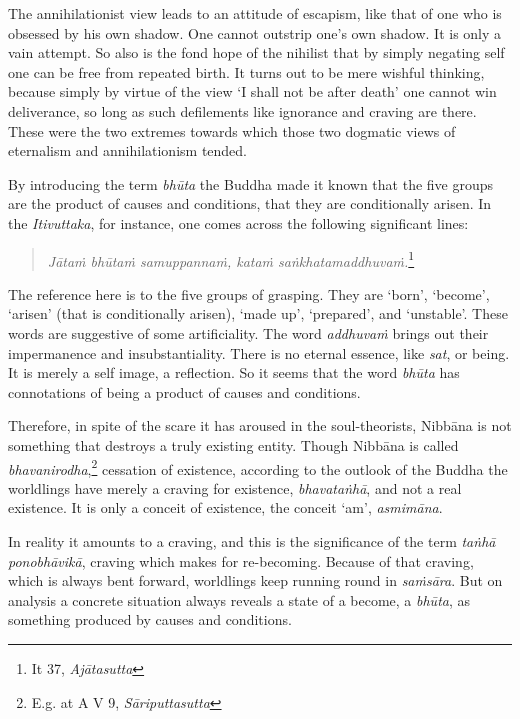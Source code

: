 The annihilationist view leads to an attitude of escapism, like that of one who is obsessed by his own shadow. One cannot outstrip one's own shadow. It is only a vain attempt. So also is the fond hope of the nihilist that by simply negating self one can be free from repeated birth. It turns out to be mere wishful thinking, because simply by virtue of the view `I shall not be after death' one cannot win deliverance, so long as such defilements like ignorance and craving are there. These were the two extremes towards which those two dogmatic views of eternalism and annihilationism tended.

By introducing the term \emph{bhūta} the Buddha made it known that the five groups are the product of causes and conditions, that they are conditionally arisen. In the \emph{Itivuttaka}, for instance, one comes across the following significant lines:

\begin{quote}
\emph{Jātaṁ bhūtaṁ samuppannaṁ, kataṁ saṅkhatamaddhuvaṁ.}\footnote{It 37, \emph{Ajātasutta}}
\end{quote}

The reference here is to the five groups of grasping. They are `born', `become', `arisen' (that is conditionally arisen), `made up', `prepared', and `unstable'. These words are suggestive of some artificiality. The word \emph{addhuvaṁ} brings out their impermanence and insubstantiality. There is no eternal essence, like \emph{sat}, or being. It is merely a self image, a reflection. So it seems that the word \emph{bhūta} has connotations of being a product of causes and conditions.

Therefore, in spite of the scare it has aroused in the soul-theorists, Nibbāna is not something that destroys a truly existing entity. Though Nibbāna is called \emph{bhavanirodha},\footnote{E.g. at A V 9, \emph{Sāriputtasutta}} cessation of existence, according to the outlook of the Buddha the worldlings have merely a craving for existence, \emph{bhavataṅhā}, and not a real existence. It is only a conceit of existence, the conceit `am', \emph{asmimāna}.

In reality it amounts to a craving, and this is the significance of the term \emph{taṅhā ponobhāvikā}, craving which makes for re-becoming. Because of that craving, which is always bent forward, worldlings keep running round in \emph{saṁsāra}. But on analysis a concrete situation always reveals a state of a become, a \emph{bhūta}, as something produced by causes and conditions.

